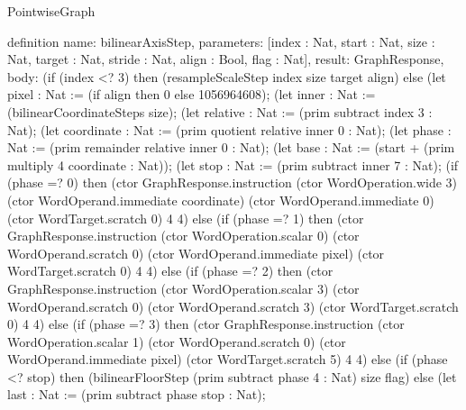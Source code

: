 \begin{lexlean}{PointwiseGraph}
\begin{semanticmodule}
definition{
  name: bilinearAxisStep,
  parameters: [index : Nat, start : Nat, size : Nat, target : Nat, stride : Nat, align : Bool, flag : Nat],
  result: GraphResponse,
  body: (if (index <? 3) then (resampleScaleStep index size target align) else (let pixel : Nat := (if align then 0 else 1056964608);
      (let inner : Nat := (bilinearCoordinateSteps size);
      (let relative : Nat := (prim subtract index 3 : Nat);
      (let coordinate : Nat := (prim quotient relative inner 0 : Nat);
      (let phase : Nat := (prim remainder relative inner 0 : Nat);
      (let base : Nat := (start + (prim multiply 4 coordinate : Nat));
      (let stop : Nat := (prim subtract inner 7 : Nat);
      (if (phase =? 0) then (ctor GraphResponse.instruction (ctor WordOperation.wide 3) (ctor WordOperand.immediate coordinate) (ctor WordOperand.immediate 0) (ctor WordTarget.scratch 0) 4 4) else (if (phase =? 1) then (ctor GraphResponse.instruction (ctor WordOperation.scalar 0) (ctor WordOperand.scratch 0) (ctor WordOperand.immediate pixel) (ctor WordTarget.scratch 0) 4 4) else (if (phase =? 2) then (ctor GraphResponse.instruction (ctor WordOperation.scalar 3) (ctor WordOperand.scratch 0) (ctor WordOperand.scratch 3) (ctor WordTarget.scratch 0) 4 4) else (if (phase =? 3) then (ctor GraphResponse.instruction (ctor WordOperation.scalar 1) (ctor WordOperand.scratch 0) (ctor WordOperand.immediate pixel) (ctor WordTarget.scratch 5) 4 4) else (if (phase <? stop) then (bilinearFloorStep (prim subtract phase 4 : Nat) size flag) else (let last : Nat := (prim subtract phase stop : Nat);
}
\end{semanticmodule}
\end{lexlean}
